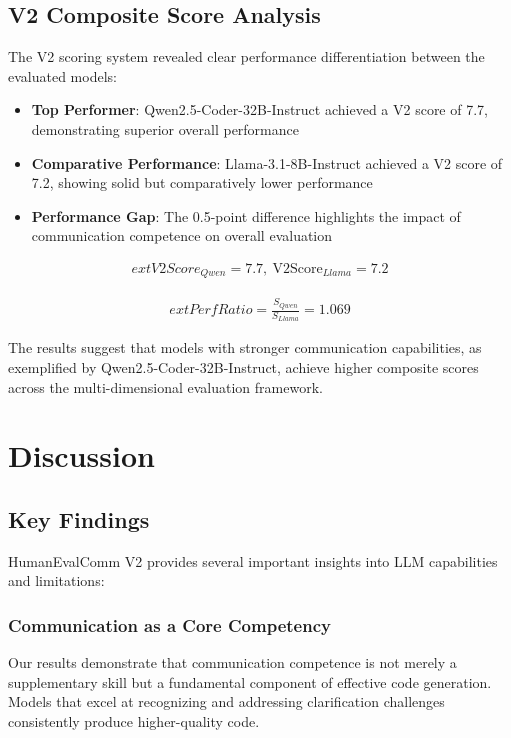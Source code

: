 \documentclass[conference]{IEEEtran}
\begin{document}
\subsection{V2 Composite Score Analysis}

The V2 scoring system revealed clear performance differentiation between the evaluated models:

\begin{itemize}
    \item \textbf{Top Performer}: Qwen2.5-Coder-32B-Instruct achieved a V2 score of 7.7, demonstrating superior overall performance
    \item \textbf{Comparative Performance}: Llama-3.1-8B-Instruct achieved a V2 score of 7.2, showing solid but comparatively lower performance
    \item \textbf{Performance Gap}: The 0.5-point difference highlights the impact of communication competence on overall evaluation
\end{itemize}

\begin{align}
    	ext{V2Score}_{Qwen} = 7.7,\ \text{V2Score}_{Llama} = 7.2
\end{align}

\begin{align}
    	ext{PerfRatio} = \frac{S_{Qwen}}{S_{Llama}} = 1.069
\end{align}

The results suggest that models with stronger communication capabilities, as exemplified by Qwen2.5-Coder-32B-Instruct, achieve higher composite scores across the multi-dimensional evaluation framework.

\section{Discussion}

\subsection{Key Findings}

HumanEvalComm V2 provides several important insights into LLM capabilities and limitations:

\subsubsection{Communication as a Core Competency}

Our results demonstrate that communication competence is not merely a supplementary skill but a fundamental component of effective code generation. Models that excel at recognizing and addressing clarification challenges consistently produce higher-quality code.
\end{document}
